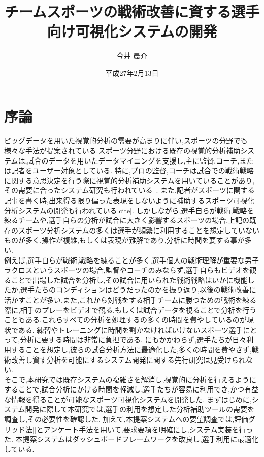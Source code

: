 \documentclass[sotsuron]{kuee}
\title{チームスポーツの戦術改善に資する選手向け可視化システムの開発}
\author{今井 晨介}
\date{平成27年2月13日}
\begin{document}
\maketitle	
\tableofcontents


\chapter{序論}
	ビッグデータを用いた視覚的分析の需要が高まりに伴い,スポーツの分野でも様々な手法が提案されている.スポーツ分野における既存の視覚的分析補助システムは,試合のデータを用いたデータマイニングを支援し,主に監督,コーチ,または記者をユーザー対象としている.
	特に,プロの監督,コーチは試合での戦術戦略に関する意思決定を行う際に視覚的分析補助システムを用いていることがあり,その需要に合ったシステム研究も行われている~\cite{SoccerStory}.
	また,記者がスポーツに関する記事を書く時,出来得る限り偏った表現をしないように補助するスポーツ可視化分析システムの開発も行われている[cite].
	しかしながら,選手自らが戦術,戦略を練るチームや,選手自らの分析が試合に大きく影響するスポーツの場合,上記の既存のスポーツ分析システムの多くは選手が頻繁に利用することを想定していないものが多く,操作が複雑,もしくは表現が難解であり,分析に時間を要する事が多い.
	\\例えば,選手自らが戦術,戦略を練ることが多く,選手個人の戦術理解が重要な男子ラクロスというスポーツの場合,監督やコーチのみならず,選手自らもビデオを観ることで出場した試合を分析し,その試合に用いられた戦術戦略はいかに機能したか,選手たちのコンディションはどうだったのかを振り返り,以後の戦術改善に活かすことが多い.また,これから対戦をする相手チームに勝つための戦術を練る際に,相手のプレーをビデオで観る,もしくは試合データを視ることで分析を行うこともある.これらすべての分析を処理するの多くの時間を費やしているのが現状である.
	練習やトレーニングに時間を割かなければいけないスポーツ選手にとって,分析に要する時間は非常に負担である.
	にもかかわらず,選手たちが日々利用することを想定し,彼らの試合分析方法に最適化した,多くの時間を費やさず,戦術改善し資す分析を可能にするシステム開発に関する先行研究は見受けられない.
	\\そこで,本研究では既存システムの複雑さを解消し,視覚的に分析を行えるようにすることで,試合分析にかける時間を軽減し,選手たちが容易に利用でき,かつ有益な情報を得ることが可能なスポーツ可視化システムを開発した.
	まずはじめに,システム開発に際して本研究では,選手の利用を想定した分析補助ツールの需要を調査し,その必要性を確認した.
	加えて,本提案システムへの要望調査では,評価グリッド法[]とアンケート手法を用いて,要求要項を明確にし,システム実装を行った.
	本提案システムはダッシュボードフレームワークを改良し,選手利用に最適化している.
\end{document}
